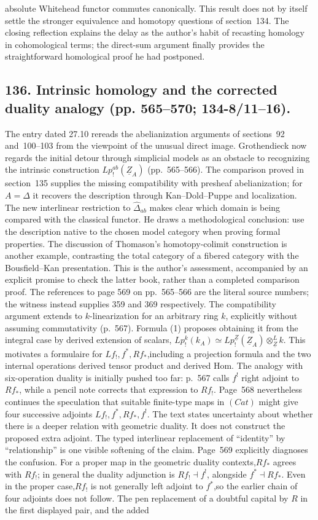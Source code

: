 \documentclass[10pt,oneside]{book}
\begin{document}
absolute Whitehead functor commutes canonically. This result does not by itself settle the stronger equivalence and homotopy questions of section~134. The closing reflection explains the delay as the author's habit of recasting homology in cohomological terms; the direct-sum argument finally provides the straightforward homological proof he had postponed.

\subsection*{136. Intrinsic homology and the corrected duality analogy (pp. 565--570; 134-8/11--16).}
The entry dated 27.10 rereads the abelianization arguments of sections~92 and~100--103 from the viewpoint of the unusual direct image. Grothendieck now regards the initial detour through simplicial models as an obstacle to recognizing the intrinsic construction $Lp^{ab}_{!}(\underline Z_A)$ (pp.~565--566). The comparison proved in section~135 supplies the missing compatibility with presheaf abelianization; for $A=\Delta$ it recovers the description through Kan--Dold--Puppe and localization. The new interlinear restriction to $\widehat\Delta_{ab}$ makes clear which domain is being compared with the classical functor. He draws a methodological conclusion: use the description native to the chosen model category when proving formal properties. The discussion of Thomason's homotopy-colimit construction is another example, contrasting the total category of a fibered category with the Bousfield--Kan presentation. This is the author's assessment, accompanied by an explicit promise to check the latter book, rather than a completed comparison proof. The references to page 569 on pp.~565--566 are the literal source numbers; the witness instead supplies 359 and 369 respectively. The compatibility argument extends to $k$-linearization for an arbitrary ring $k$, explicitly without assuming commutativity (p.~567). Formula (1) proposes obtaining it from the integral case by derived extension of scalars, $Lp^k_{!}(k_A)\simeq Lp^{\underline Z}_{!}(\underline Z_A)\otimes^{L}_{\underline Z}k$. This motivates a formulaire for $Lf_{!},f^*,Rf_*$,including a projection formula and the two internal operations derived tensor product and derived Hom. The analogy with six-operation duality is initially pushed too far: p.~567 calls $f^!$ right adjoint to $Rf_*$, while a pencil note corrects that expression to $Rf_!$. Page~568 nevertheless continues the speculation that suitable finite-type maps in $(Cat)$ might give four successive adjoints $Lf_!,f^*,Rf_*,f^!$. The text states uncertainty about whether there is a deeper relation with geometric duality. It does not construct the proposed extra adjoint. The typed interlinear replacement of ``identity'' by ``relationship'' is one visible softening of the claim. Page~569 explicitly diagnoses the confusion. For a proper map in the geometric duality contexts,$Rf_*$ agrees with $Rf_!$; in general the duality adjunction is $Rf_!\dashv f^!$, alongside $f^*\dashv Rf_*$. Even in the proper case,$Rf_!$ is not generally left adjoint to $f^*$,so the earlier chain of four adjoints does not follow. The pen replacement of a doubtful capital by $R$ in the first displayed pair, and the added 
\end{document}
